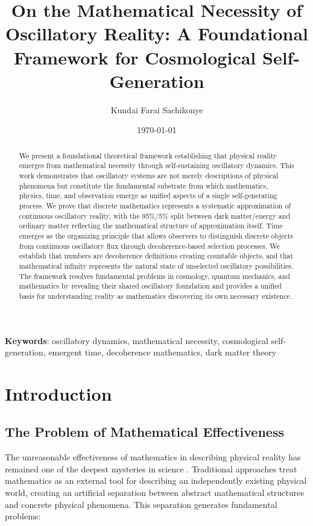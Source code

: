 \documentclass[11pt]{article}
\title{On the Mathematical Necessity of Oscillatory Reality: A Foundational Framework for Cosmological Self-Generation}
\author{Kundai Farai Sachikonye}
\date{\today}
\theoremstyle{remark}
\begin{document}
\maketitle

\begin{abstract}
We present a foundational theoretical framework establishing that physical reality emerges from mathematical necessity through self-sustaining oscillatory dynamics. This work demonstrates that oscillatory systems are not merely descriptions of physical phenomena but constitute the fundamental substrate from which mathematics, physics, time, and observation emerge as unified aspects of a single self-generating process. We prove that discrete mathematics represents a systematic approximation of continuous oscillatory reality, with the 95\%/5\% split between dark matter/energy and ordinary matter reflecting the mathematical structure of approximation itself. Time emerges as the organizing principle that allows observers to distinguish discrete objects from continuous oscillatory flux through decoherence-based selection processes. We establish that numbers are decoherence definitions creating countable objects, and that mathematical infinity represents the natural state of unselected oscillatory possibilities. The framework resolves fundamental problems in cosmology, quantum mechanics, and mathematics by revealing their shared oscillatory foundation and provides a unified basis for understanding reality as mathematics discovering its own necessary existence.
\end{abstract}

\textbf{Keywords}: oscillatory dynamics, mathematical necessity, cosmological self-generation, emergent time, decoherence mathematics, dark matter theory

\section{Introduction}

\subsection{The Problem of Mathematical Effectiveness}

The unreasonable effectiveness of mathematics in describing physical reality has remained one of the deepest mysteries in science \cite{wigner1960unreasonable}. Traditional approaches treat mathematics as an external tool for describing an independently existing physical world, creating an artificial separation between abstract mathematical structures and concrete physical phenomena. This separation generates fundamental problems:
\end{document}
